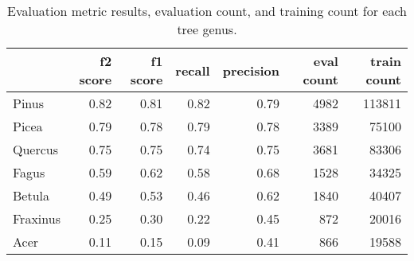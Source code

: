 \begin{table}
\caption{Evaluation metric results, evaluation count, and training count for each tree genus.}
\label{tab:class_analysis}
\centering

\begin{tabular}{lrrrrrr}
\toprule
 & f2 score & f1 score & recall & precision & eval count & train count \\
\midrule
Pinus & 0.82 & 0.81 & 0.82 & 0.79 & 4982 & 113811 \\
Picea & 0.79 & 0.78 & 0.79 & 0.78 & 3389 & 75100 \\
Quercus & 0.75 & 0.75 & 0.74 & 0.75 & 3681 & 83306 \\
Fagus & 0.59 & 0.62 & 0.58 & 0.68 & 1528 & 34325 \\
Betula & 0.49 & 0.53 & 0.46 & 0.62 & 1840 & 40407 \\
Fraxinus & 0.25 & 0.30 & 0.22 & 0.45 & 872 & 20016 \\
Acer & 0.11 & 0.15 & 0.09 & 0.41 & 866 & 19588 \\
\bottomrule
\end{tabular}
\end{table}
